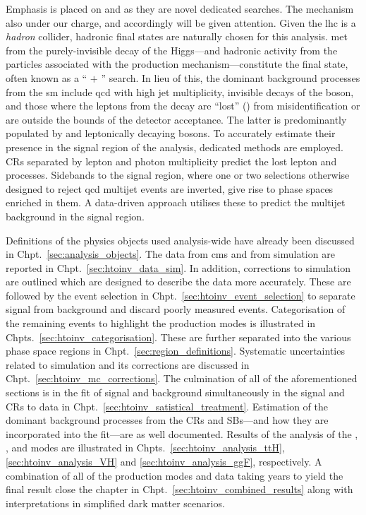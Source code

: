 Emphasis is placed on \ttH and \VH as they are novel dedicated searches. The \ggH mechanism also under our charge, and accordingly will be given attention. Given the \acrshort{lhc} is a \emph{hadron} collider, hadronic final states are naturally chosen for this analysis. \Gls{met} from the purely-invisible decay of the Higgs---and hadronic activity from the particles associated with the production mechanism---constitute the final state, often known as a `` $+$ \ptvecmiss'' search. In lieu of this, the dominant background processes from the \acrlong{sm} include \acrshort{qcd} with high \gls{jet} multiplicity, invisible decays of the \PZ boson, and those where the leptons from the decay are ``lost'' (\lostlepton) from misidentification or are outside the bounds of the detector acceptance. The latter is predominantly populated by \ttbar and leptonically decaying \PW bosons. To accurately estimate their presence in the signal region of the analysis, dedicated methods are employed. \Glspl{CR} separated by lepton and photon multiplicity predict the lost lepton and \ztonunu processes. Sidebands to the signal region, where one or two selections otherwise designed to reject \acrshort{qcd} multijet events are inverted, give rise to phase spaces enriched in them. A data-driven approach utilises these to predict the multijet background in the signal region.

Definitions of the physics objects used analysis-wide have already been discussed in Chpt.~\ref{sec:analysis_objects}. The data from \acrshort{cms} and from simulation are reported in Chpt.~\ref{sec:htoinv_data_sim}. In addition, corrections to simulation are outlined which are designed to describe the data more accurately. These are followed by the event selection in Chpt.~\ref{sec:htoinv_event_selection} to separate signal from background and discard poorly measured events. Categorisation of the remaining events to highlight the production modes is illustrated in Chpts.~\ref{sec:htoinv_categorisation}. These are further separated into the various phase space regions in Chpt.~\ref{sec:region_definitions}. Systematic uncertainties related to simulation and its corrections are discussed in Chpt.~\ref{sec:htoinv_mc_corrections}. The culmination of all of the aforementioned sections is in the fit of signal and background simultaneously in the signal and \glspl{CR} to data in Chpt.~\ref{sec:htoinv_satistical_treatment}. Estimation of the dominant background processes from the \glspl{CR} and \glspl{SB}---and how they are incorporated into the fit---are as well documented. Results of the analysis of the \ttH, \VH, and \ggH modes are illustrated in Chpts.~\ref{sec:htoinv_analysis_ttH}, \ref{sec:htoinv_analysis_VH} and \ref{sec:htoinv_analysis_ggF}, respectively. A combination of all of the production modes and data taking years to yield the final result close the chapter in Chpt.~\ref{sec:htoinv_combined_results} along with interpretations in simplified dark matter scenarios.



